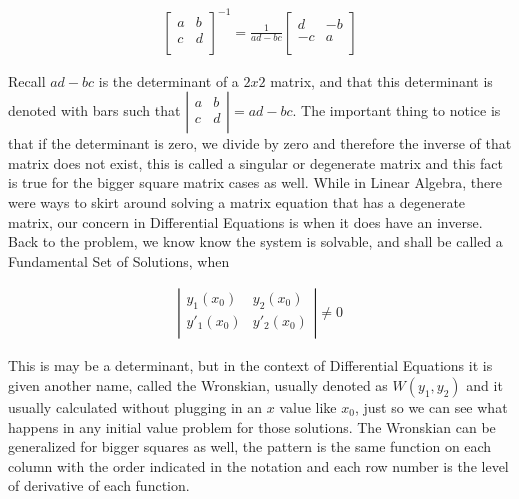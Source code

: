\documentclass[12pt]{article}
\begin{document}
\begin{align*}
    \left[
\begin{array}{cc}
a & b \\
c & d \\
\end{array}
\right]^{-1} = \frac{1}{ad-bc}
\left[
\begin{array}{cc}
d & -b \\
-c & a \\
\end{array}
\right]
\end{align*}

Recall $ad-bc$ is the determinant of a $2x2$ matrix, and that this determinant is denoted with bars such that $\left|
\begin{array}{cc}
a & b \\
c & d \\
\end{array}
\right|=ad-bc$. The important thing to notice is that if the determinant is zero, we divide by zero and therefore the inverse of that matrix does not exist, this is called a singular or degenerate matrix and this fact is true for the bigger square matrix cases as well. While in Linear Algebra, there were ways to skirt around solving a matrix equation that has a degenerate matrix, our concern in Differential Equations is when it does have an inverse. \\

Back to the problem, we know know the system is solvable, and shall be called a Fundamental Set of Solutions, when 

\begin{align*}
    \left|
\begin{array}{cc}
y_1(x_0) & y_2(x_0) \\
y'_1(x_0) & y'_2(x_0) \\
\end{array}
\right| \neq 0
\end{align*}

This is may be a determinant, but in the context of Differential Equations it is given another name, called the Wronskian, usually denoted as $W(y_1,y_2)$ and it usually calculated without plugging in an $x$ value like $x_0$, just so we can see what happens in any initial value problem for those solutions. The Wronskian can be generalized for bigger squares as well, the pattern is the same function on each column with the order indicated in the notation and each row number is the level of derivative of each function. \\
\end{document}
